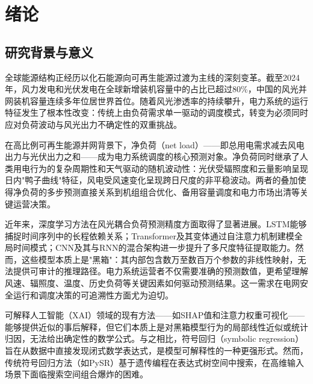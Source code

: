 \documentclass[12pt,a4paper,oneside]{ctexbook}
\begin{document}
\tableofcontents

\mainmatter

\chapter{绪论}

\section{研究背景与意义}

全球能源结构正经历以化石能源向可再生能源过渡为主线的深刻变革。截至2024年，风力发电和光伏发电在全球新增装机容量中的占比已超过80\%，中国的风光并网装机容量连续多年位居世界首位。随着风光渗透率的持续攀升，电力系统的运行特征发生了根本性改变：传统上由负荷需求单一驱动的调度模式，转变为必须同时应对负荷波动与风光出力不确定性的双重挑战\cite{hong2016probabilistic,kaur2016net}。

在高比例可再生能源并网背景下，净负荷（net load）——即总用电需求减去风电出力与光伏出力之和——成为电力系统调度的核心预测对象。净负荷同时继承了人类用电行为的复杂周期性和天气驱动的随机波动性：光伏受辐照度和云量影响呈现日内"鸭子曲线"特征，风电受风速变化呈现跨日尺度的非平稳波动\cite{hanifi2020critical,inman2013solar}。两者的叠加使得净负荷的多步预测直接关系到机组组合优化、备用容量调度和电力市场出清等关键运营决策\cite{kaur2016net}。

近年来，深度学习方法在风光耦合负荷预测精度方面取得了显著进展。LSTM能够捕捉时间序列中的长程依赖关系\cite{silva2024lstm}；Transformer及其变体通过自注意力机制建模全局时间模式\cite{ebrahimzadeh2024ai}；CNN及其与RNN的混合架构进一步提升了多尺度特征提取能力\cite{wang2023hybrid}。然而，这些模型本质上是"黑箱"：其内部包含数万至数百万个参数的非线性映射，无法提供可审计的推理路径。电力系统运营者不仅需要准确的预测数值，更希望理解风速、辐照度、温度、历史负荷等关键因素如何驱动预测结果。这一需求在电网安全运行和调度决策的可追溯性方面尤为迫切。

可解释人工智能（XAI）领域的现有方法——如SHAP值和注意力权重可视化——能够提供近似的事后解释，但它们本质上是对黑箱模型行为的局部线性近似或统计归因，无法给出确定性的数学公式\cite{machlev2022explainable}。与之相比，符号回归（symbolic regression）旨在从数据中直接发现闭式数学表达式，是模型可解释性的一种更强形式。然而，传统符号回归方法（如PySR\cite{cranmer2023pysr}）基于遗传编程在表达式树空间中搜索，在高维输入场景下面临搜索空间组合爆炸的困难\cite{panczyk2025opening}。
\end{document}
